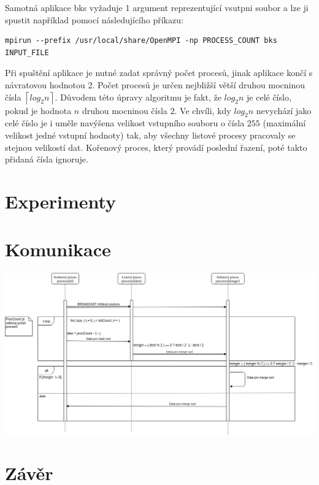\documentclass[11pt,a4paper,titlepage]{article}
\begin{document}
        Samotná aplikace bks vyžaduje 1 argument reprezentující vsutpni soubor a lze ji spustit například pomocí následujícího příkazu:
\begin{verbatim}
mpirun --prefix /usr/local/share/OpenMPI -np PROCESS_COUNT bks INPUT_FILE
\end{verbatim}
        Při spuštění aplikace je nutné zadat správný počet procesů, jinak aplikace končí s návratovou hodnotou 2.
        Počet procesů je určen nejbližší větší druhou mocninou čísla $\left \lceil{log_2 n}\right \rceil$.
        Důvodem této úpravy algoritmu je fakt, že $log_2 n$ je celé číslo, pokud je hodnota $n$ druhou
        mocninou čísla $2$. Ve chvíli, kdy $log_2 n$ nevychází jako celé číslo je i uměle navýšena velikost vstupního
        souboru o čísla $255$ (maximální velikost jedné vstupní hodnoty) tak, aby všechny listové procesy pracovaly se stejnou
        velikostí dat. Kořenový proces, který provádí poslední řazení, poté takto přidaná čísla ignoruje.

	\section{Experimenty}

	\section{Komunikace}
    \includegraphics[width=\textwidth]{sequenceDiagram.png}
	\section{Závěr}
\end{document}
